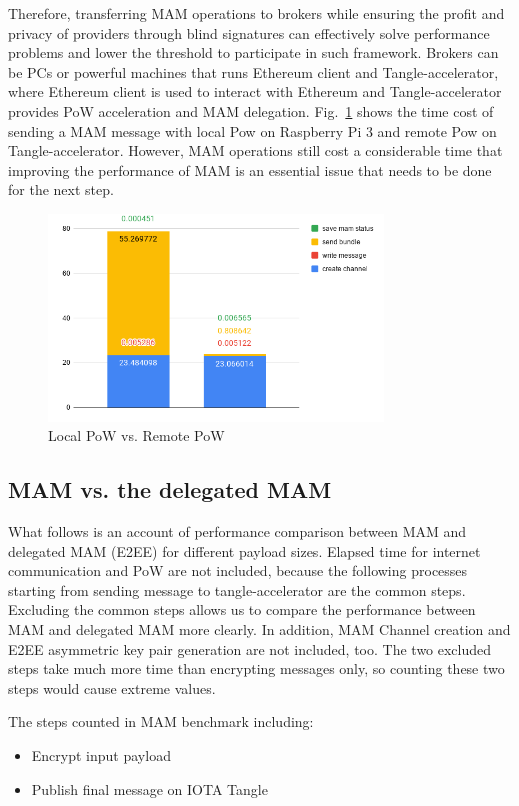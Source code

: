 \documentclass[conference]{IEEEtran}
\begin{document}
Therefore, transferring MAM operations to brokers while ensuring the profit and privacy of providers through blind signatures can effectively solve performance problems and lower the threshold to participate in such framework. Brokers can be PCs or powerful machines that runs Ethereum client and Tangle-accelerator, where Ethereum client is used to interact with Ethereum and Tangle-accelerator provides PoW acceleration and MAM delegation. Fig.~\ref{fig:rpi3_pow} shows the time cost of sending a MAM message with local Pow on Raspberry Pi 3 and remote Pow on Tangle-accelerator. However, MAM operations still cost a considerable time that improving the performance of MAM is an essential issue that needs to be done for the next step.

\begin{figure}[!t]
    \centering
    \includegraphics[width=3.5in]{rpi3_pow}
    \caption{Local PoW vs. Remote PoW}
    \label{fig:rpi3_pow}
\end{figure}

\subsection{MAM vs. the delegated MAM}
\label{section:smart_contract_evaluation}
What follows is an account of performance comparison between MAM and delegated MAM (E2EE) for different payload sizes. Elapsed time for internet communication and PoW are not included, because the following processes starting from sending message to tangle-accelerator are the common steps. Excluding the common steps allows us to compare the performance between MAM and delegated MAM more clearly. In addition, MAM Channel creation and E2EE asymmetric key pair generation are not included, too. The two excluded steps take much more time than encrypting messages only, so counting these two steps would cause extreme values.

The steps counted in MAM benchmark including:
\begin{itemize}
	\item Encrypt input payload
	\item Publish final message on IOTA Tangle
\end{itemize}
\end{document}

